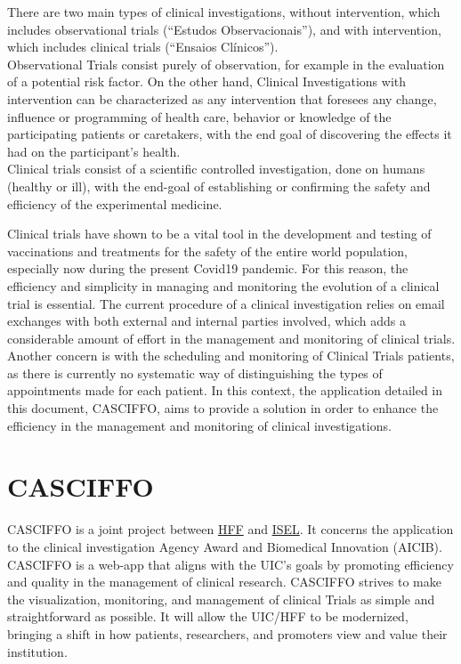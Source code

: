There are two main types of clinical investigations, without intervention, which includes observational trials (``Estudos Observacionais''), and with intervention, which includes clinical trials (``Ensaios Clínicos'').\\
Observational Trials consist purely of observation, for example in the
evaluation of a potential risk factor. On the other hand, Clinical
Investigations with intervention can be characterized as any
intervention that foresees any change, influence or programming of
health care, behavior or knowledge of the participating patients or
caretakers, with the end goal of discovering the effects it had on the
participant's health.\\
Clinical trials consist of a scientific controlled investigation, done
on humans (healthy or ill), with the end-goal of establishing or confirming the safety and efficiency of the experimental medicine.  

Clinical trials have shown to be a vital tool in the development and testing of vaccinations and treatments for the safety of the entire world population, especially now during the present Covid19 pandemic. For this reason, the efficiency and simplicity in managing and monitoring the evolution of a clinical trial is essential.  
The current procedure of a clinical investigation relies on email exchanges with both external and internal parties involved, which adds a considerable amount of effort in the management and monitoring of clinical trials. Another concern is with the scheduling and monitoring of Clinical Trials patients, as there is currently no systematic way of distinguishing the types of appointments made for each patient.  
In this context, the application detailed in this document, CASCIFFO, aims to provide a solution in order to enhance the efficiency in the management and monitoring of clinical investigations.


\section{CASCIFFO}\label{ch:intro:sec:casciffo}

CASCIFFO is a joint project between \href{https://hff.min-saude.pt/}{HFF} and \href{https://www.isel.pt/}{ISEL}. It concerns the application to the clinical investigation Agency Award and Biomedical Innovation (AICIB).  
CASCIFFO is a web-app that aligns with the UIC's goals by promoting efficiency and quality in the management of clinical research.
CASCIFFO strives to make the visualization, monitoring, and management of clinical Trials as simple and straightforward as possible.   
It will allow the UIC/HFF to be modernized, bringing a shift in how patients, researchers, and promoters view and value their institution.  

